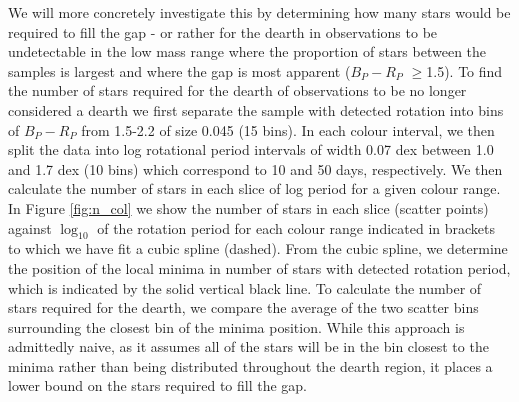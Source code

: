 We will more concretely investigate this by determining how many stars would be required to fill the gap - or rather for the dearth in observations to be undetectable in the low mass range where the proportion of stars between the samples is largest and where the gap is most apparent ($B_P-R_P$ $\geq$1.5).
To find the number of stars required for the dearth of observations to be no longer considered a dearth we first separate the sample with detected rotation into bins of $B_P - R_P$  from 1.5-2.2 of size 0.045 (15 bins).
In each colour interval, we then split the data into log rotational period intervals of width 0.07 dex between 1.0 and 1.7 dex (10 bins) which correspond to 10 and 50 days, respectively.
We then calculate the number of stars in each slice of log period for a given colour range.
In Figure \ref{fig:n_col} we show the number of stars in each slice (scatter points) against $\log_{10}$ of the rotation period for each colour range indicated in brackets to which we have fit a cubic spline (dashed).
From the cubic spline, we determine the position of the local minima in number of stars with detected rotation period, which is indicated by the solid vertical black line.
To calculate the number of stars required for the dearth, we compare the average of the two scatter bins surrounding the closest bin of the minima position.
While this approach is admittedly naive, as it assumes all of the stars will be in the bin closest to the minima rather than being distributed throughout the dearth region, it places a lower bound on the stars required to fill the gap.

